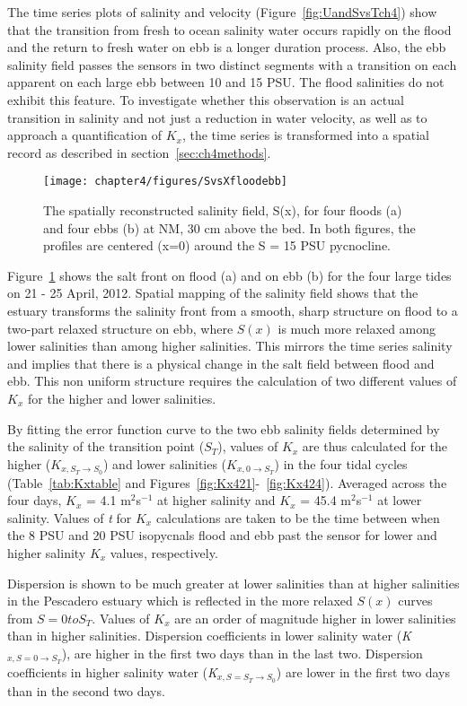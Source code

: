 The time series plots of salinity and velocity (Figure~\ref{fig:UandSvsTch4}) show that the transition from fresh to ocean salinity water occurs rapidly on the flood and the return to fresh water on ebb is a longer duration process. Also, the ebb salinity field passes the sensors in two distinct segments with a transition on each apparent on each large ebb between 10 and 15 PSU. The flood salinities do not exhibit this feature. To investigate whether this observation is an actual transition in salinity and not just a reduction in water velocity, as well as to approach a quantification of $K_x$, the time series is transformed into a spatial record as described in section~\ref{sec:ch4methods}. 

\begin{figure}[hp]
	\texttt{[image: chapter4/figures/SvsXfloodebb]} 
\caption{The spatially reconstructed salinity field, S(x), for four floods (a) and four ebbs (b) at NM, 30 cm above the bed. In both figures, the profiles are centered (x=0) around the S = 15 PSU pycnocline.} \label{fig:SvsXall}
\end{figure}

Figure~\ref{fig:SvsXall} shows the salt front on flood (a) and on ebb (b) for the four large tides on 21 - 25 April, 2012. Spatial mapping of the salinity field shows that the estuary transforms  the salinity front from a smooth, sharp structure on flood to a two-part relaxed structure on ebb, where $S(x)$ is much more relaxed among lower salinities than among higher salinities. This mirrors the time series salinity and implies that there is a physical change in the salt field between flood and ebb. This non uniform structure requires the calculation of two different values of $K_x$ for the higher and lower salinities.

By fitting the error function curve to the two ebb salinity fields determined by the salinity of the transition point ($S_T$), values of $K_x$ are thus calculated for the higher ($K_{x,S_T\rightarrow S_0}$) and lower salinities ($K_{x,0\rightarrow S_T}$) in the four tidal cycles (Table~\ref{tab:Kxtable} and Figures~\ref{fig:Kx421}-~\ref{fig:Kx424}). Averaged across the four days, $K_x$ = 4.1 m$^2$s$^{-1}$ at higher salinity and $K_x$ = 45.4 m$^2$s$^{-1}$ at lower salinity. Values of \emph{t} for $K_x$ calculations are taken to be the time between when the 8 PSU and 20 PSU isopycnals flood and ebb past the sensor for lower and higher salinity $K_x$ values, respectively. 

Dispersion is shown to be much greater at lower salinities than at higher salinities in the Pescadero estuary which is reflected in the more relaxed $S(x)$ curves from $S=0 to S_T$.  Values of $K_x$ are an order of magnitude higher in lower salinities than in higher salinities. Dispersion coefficients in lower salinity water (\emph{K$_{x,S=0 \rightarrow S_T}$}), are higher in the first two days than in the last two. Dispersion coefficients in higher salinity water (\emph{K$_{x,S=S_T \rightarrow S_0}$}) are lower in the first two days than in the second two days. 

